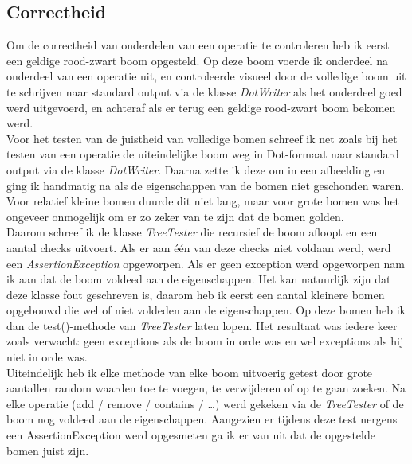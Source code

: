 \documentclass[11pt,a4paper]{report}
\begin{document}
\subsection{Correctheid}
Om de correctheid van onderdelen van een operatie te controleren heb ik eerst een geldige rood-zwart boom opgesteld. Op deze boom voerde ik onderdeel na onderdeel van een operatie uit, en controleerde visueel door de volledige boom uit te schrijven naar standard output via de klasse \textsl{DotWriter} als het onderdeel goed werd uitgevoerd, en achteraf als er terug een geldige rood-zwart boom bekomen werd.\\
Voor het testen van de juistheid van volledige bomen schreef ik net zoals bij het testen van een operatie de uiteindelijke boom weg in Dot-formaat naar standard output via de klasse \textsl{DotWriter}. Daarna zette ik deze om in een afbeelding en ging ik handmatig na als de eigenschappen van de bomen niet geschonden waren. Voor relatief kleine bomen duurde dit niet lang, maar voor grote bomen was het ongeveer onmogelijk om er zo zeker van te zijn dat de bomen golden. \\
Daarom schreef ik de klasse \textsl{TreeTester} die recursief de boom afloopt en een aantal checks uitvoert. Als er aan \'e\'en van deze checks niet voldaan werd, werd een \textsl{AssertionException} opgeworpen. Als er geen exception werd opgeworpen nam ik aan dat de boom voldeed aan de eigenschappen. Het kan natuurlijk zijn dat deze klasse fout geschreven is, daarom heb ik eerst een aantal kleinere bomen opgebouwd die wel of niet voldeden aan de eigenschappen. Op deze bomen heb ik dan de test()-methode van \textsl{TreeTester} laten lopen. Het resultaat was iedere keer zoals verwacht: geen exceptions als de boom in orde was en wel exceptions als hij niet in orde was.\\
Uiteindelijk heb ik elke methode van elke boom uitvoerig getest door grote aantallen random waarden toe te voegen, te verwijderen of op te gaan zoeken. Na elke operatie (add / remove / contains / \ldots) werd gekeken via de \textsl{TreeTester} of de boom nog voldeed aan de eigenschappen. Aangezien er tijdens deze test nergens een AssertionException werd opgesmeten ga ik er van uit dat de opgestelde bomen juist zijn.
\end{document}
